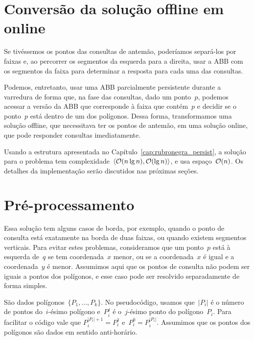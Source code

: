 \documentclass[main.tex]{subfiles}
\begin{document}
\section{Conversão da solução offline em online}

Se tivéssemos os pontos das consultas de antemão, poderíamos separá-los por faixas e, ao percorrer os segmentos da esquerda para a direita, usar a ABB com os segmentos da faixa para determinar a resposta para cada uma das consultas.

Podemos, entretanto, usar uma ABB parcialmente persistente durante a varredura de forma que, na fase das consultas, dado um ponto~$p$, podemos acessar a versão da ABB que corresponde à faixa que contém~$p$ e decidir se o ponto~$p$ está dentro de um dos polígonos. Dessa forma, transformamos uma solução offline, que necessitava ter os pontos de antemão, em uma solução online, que pode responder consultas imediatamente.

Usando a estrutura apresentada no Capítulo~\ref{cap:rubronegra_persist}, a solução para o problema tem complexidade~$\langle\mathcal{O}(n \lg n), \mathcal{O}(\lg n)\rangle$, e usa espaço~$\mathcal{O}(n)$. Os detalhes da implementação serão discutidos nas próximas seções.


\section{Pré-processamento}

Essa solução tem alguns casos de borda, por exemplo, quando o ponto de consulta está exatamente na borda de duas faixas, ou quando existem segmentos verticais. Para evitar estes problemas, consideramos que um ponto~$p$ está à esquerda de~$q$ se tem coordenada~$x$ menor, ou se a coordenada~$x$ é igual e a coordenada~$y$ é menor. Assumimos aqui que os pontos de consulta não podem ser iguais a pontos dos polígonos, e esse caso pode ser resolvido separadamente de forma simples.

\providecommand{\from}{\V{from}}
\providecommand{\tto}{\V{to}}
\providecommand{\topp}{\V{top}}
\providecommand{\seg}{\V{seg}}
\providecommand{\add}{\V{add}}
\providecommand{\events}{\V{points}}
\providecommand{\rbt}{\V{rbt}}
\providecommand{\slabs}{\V{slabs}}
\providecommand{\current}{\V{current}}
\providecommand{\polygon}{\V{polygon}}

São dados polígonos~$\{P_1, \ldots, P_k\}$. No pseudocódigo, usamos que~$|P_i|$ é o número de pontos do~\mbox{$i$-ésimo} polígono e~$P_i^j$ é o~$j$-ésimo ponto do polígono~$P_i$. Para facilitar o código vale que ${P_i^{|P_i|+1} = P_i^1}$ e~${P_i^0 = P_i^{|P_i|}}$. Assumimos que os pontos dos polígonos são dados em sentido anti-horário.
\end{document}
